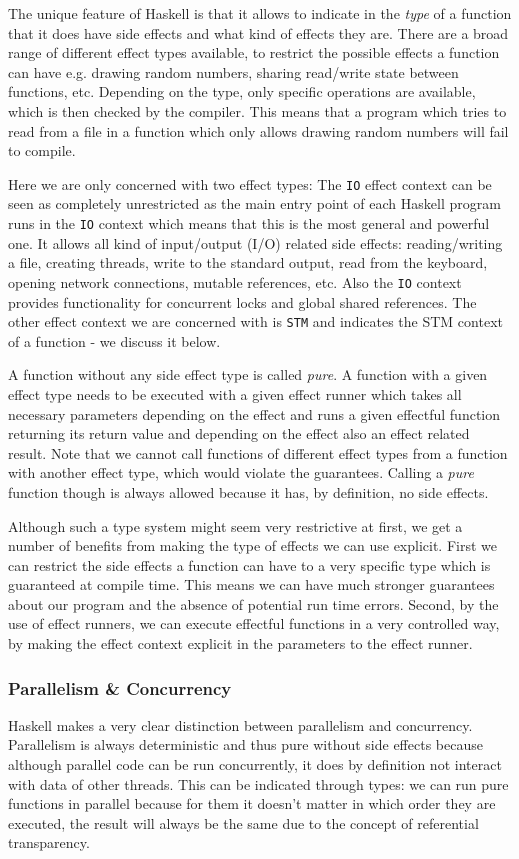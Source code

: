 The unique feature of Haskell is that it allows to indicate in the \textit{type} of a function that it does have side effects and what kind of effects they are. There are a broad range of different effect types available, to restrict the possible effects a function can have e.g. drawing random numbers, sharing read/write state between functions, etc. Depending on the type, only specific operations are available, which is then checked by the compiler. This means that a program which tries to read from a file in a function which only allows drawing random numbers will fail to compile.

Here we are only concerned with two effect types: The \texttt{IO} effect context can be seen as completely unrestricted as the main entry point of each Haskell program runs in the \texttt{IO} context which means that this is the most general and powerful one. It allows all kind of input/output (I/O) related side effects: reading/writing a file, creating threads, write to the standard output, read from the keyboard, opening network connections, mutable references, etc. Also the \texttt{IO} context provides functionality for concurrent locks and global shared references. The other effect context we are concerned with is \texttt{STM} and indicates the STM context of a function - we discuss it below. 

A function without any side effect type is called \textit{pure}. A function with a given effect type needs to be executed with a given effect runner which takes all necessary parameters depending on the effect and runs a given effectful function returning its return value and depending on the effect also an effect related result. Note that we cannot call functions of different effect types from a function with another effect type, which would violate the guarantees. Calling a \textit{pure} function though is always allowed because it has, by definition, no side effects. 

Although such a type system might seem very restrictive at first, we get a number of benefits from making the type of effects we can use explicit. First we can restrict the side effects a function can have to a very specific type which is guaranteed at compile time. This means we can have much stronger guarantees about our program and the absence of potential run time errors. Second, by the use of effect runners, we can execute effectful functions in a very controlled way, by making the effect context explicit in the parameters to the effect runner.

\subsubsection{Parallelism \& Concurrency}
Haskell makes a very clear distinction between parallelism and concurrency. Parallelism is always deterministic and thus pure without side effects because although parallel code can be run concurrently, it does by definition not interact with data of other threads. This can be indicated through types: we can run pure functions in parallel because for them it doesn't matter in which order they are executed, the result will always be the same due to the concept of referential transparency.

